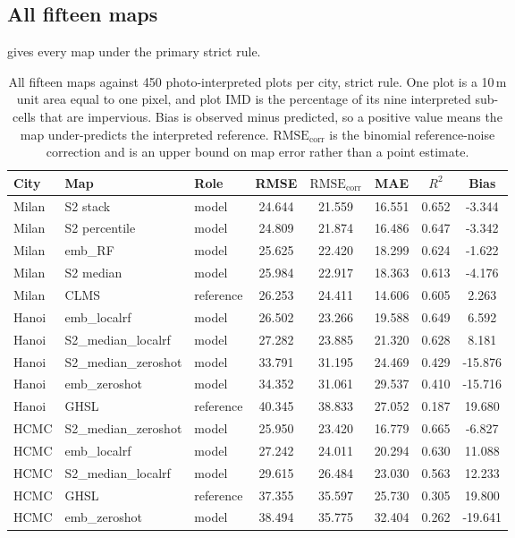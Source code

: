 \documentclass[11pt,a4paper]{article}
\begin{document}
\subsection{All fifteen maps}

 gives every map under the primary strict rule.

\begin{table}[htbp]
  \centering
  \caption{All fifteen maps against 450 photo-interpreted plots per city, strict
  rule. One plot is a 10\,m unit area equal to one pixel, and plot IMD is the
  percentage of its nine interpreted sub-cells that are impervious. Bias is
  observed minus predicted, so a positive value means the map under-predicts the
  interpreted reference. $\mathrm{RMSE}_{\mathrm{corr}}$ is the binomial
  reference-noise correction and is an upper bound on map error rather than a
  point estimate.}
  \label{tab:independent-all}
  \begin{tabular}{l l l S[table-format=2.3] S[table-format=2.3] S[table-format=2.3] S[table-format=1.3] S[table-format=-2.3]}
    \toprule
    {City} & {Map} & {Role} & {RMSE} & {$\mathrm{RMSE}_{\mathrm{corr}}$} & {MAE} & {$R^2$} & {Bias} \\
    \midrule
    Milan & S2 stack           & model     & 24.644 & 21.559 & 16.551 & 0.652 & -3.344  \\
    Milan & S2 percentile      & model     & 24.809 & 21.874 & 16.486 & 0.647 & -3.342  \\
    Milan & emb\_RF            & model     & 25.625 & 22.420 & 18.299 & 0.624 & -1.622  \\
    Milan & S2 median          & model     & 25.984 & 22.917 & 18.363 & 0.613 & -4.176  \\
    Milan & CLMS               & reference & 26.253 & 24.411 & 14.606 & 0.605 & 2.263   \\
    Hanoi & emb\_localrf       & model     & 26.502 & 23.266 & 19.588 & 0.649 & 6.592   \\
    Hanoi & S2\_median\_localrf & model    & 27.282 & 23.885 & 21.320 & 0.628 & 8.181   \\
    Hanoi & S2\_median\_zeroshot & model   & 33.791 & 31.195 & 24.469 & 0.429 & -15.876 \\
    Hanoi & emb\_zeroshot      & model     & 34.352 & 31.061 & 29.537 & 0.410 & -15.716 \\
    Hanoi & GHSL               & reference & 40.345 & 38.833 & 27.052 & 0.187 & 19.680  \\
    HCMC  & S2\_median\_zeroshot & model   & 25.950 & 23.420 & 16.779 & 0.665 & -6.827  \\
    HCMC  & emb\_localrf       & model     & 27.242 & 24.011 & 20.294 & 0.630 & 11.088  \\
    HCMC  & S2\_median\_localrf & model    & 29.615 & 26.484 & 23.030 & 0.563 & 12.233  \\
    HCMC  & GHSL               & reference & 37.355 & 35.597 & 25.730 & 0.305 & 19.800  \\
    HCMC  & emb\_zeroshot      & model     & 38.494 & 35.775 & 32.404 & 0.262 & -19.641 \\
    \bottomrule
  \end{tabular}
\end{table}
\end{document}
